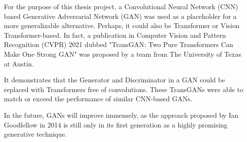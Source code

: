 

For the purpose of this thesis project, a Convolutional Neural Network (CNN) based Generative Adversarial Network (GAN)
was used as a placeholder for a more generalizable alternative. Perhaps, it could also be Transformer or Vision Transformer-based.
In fact, a publication in Computer Vision and Pattern Recognition (CVPR) 2021 dubbed "TransGAN: Two Pure Transformers Can Make One Strong GAN"
was proposed by a team from The University of Texas at Austin. \citep{jiang2021transgan}

It demonstrates that the Generator and Discriminator in a GAN could be replaced with Transformers free of 
convolutions. These TransGANs were able to match or exceed the performance of similar CNN-based GANs. \citep{jiang2021transgan}

In the future, GANs will improve immensely, as the approach proposed by Ian Goodfellow in 2014 is still only in its 
first generation as a highly promising generative technique.



